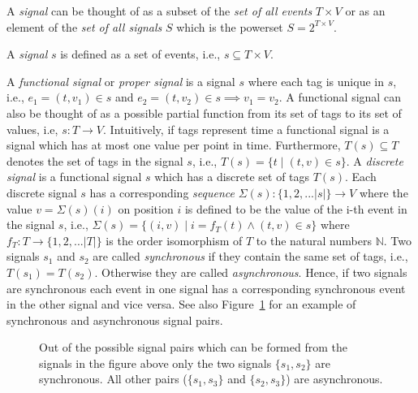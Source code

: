 A \emph{signal} can be thought of as a subset of the \emph{set of all events} $T \times V$ or as
an element of the \emph{set of all signals} $S$ which is the powerset $S = 2^{T \times V}$.
\begin{sdefinition}
A \emph{signal} $s$ is defined as a set of events, i.e., $s \subseteq T \times V$.
\end{sdefinition}
A \emph{functional signal} or \emph{proper signal} is a signal $s$ where each tag is unique in $s$,
i.e., $e_1 = (t,v_1) \in s$ and $e_2 = (t,v_2) \in s \implies v_1 = v_2$.
A functional signal can also be thought of as a possible partial function 
from its set of tags to its set of values, i.e, $s: T \to V$.
Intuitively, if tags represent time a functional signal is a signal which has
at most one value per point in time.
Furthermore, $T(s) \subseteq T$ denotes
the set of tags in the signal $s$, i.e., $T(s) = \{t \mid (t,v) \in s\}$.
A \emph{discrete signal} is a functional signal $s$ which has a discrete set of tags $T(s)$.
Each discrete signal $s$ has a corresponding \emph{sequence} $\Sigma(s) : \{1,2,...|s|\} \to V$
where the value $v = \Sigma(s)(i)$ on position $i$ is defined to be the value
of the i-th event in the signal $s$, i.e., $\Sigma(s) = \{ (i,v)  \mid i = f_T(t) \wedge (t,v) \in s\}$ where
$f_T : T \to \{1,2,...|T|\}$ is the order isomorphism of $T$ to the natural numbers $\mathbb{N}$.
Two signals $s_1$ and $s_2$ are called \emph{synchronous} if they contain
the same set of tags, i.e., $T(s_1) = T(s_2)$. Otherwise they are
called \emph{asynchronous}.
Hence, if two signals are synchronous each event in one
signal has a corresponding synchronous event in the other signal and vice versa.
See also Figure~\ref{fig:example-synchronous-signals} for an
example of synchronous and asynchronous signal pairs.

\begin{figure}
\centering

\caption{\label{fig:example-synchronous-signals}Out of the possible signal
  pairs which can be formed from the signals in the figure above only the
  two signals $\{s_1,s_2\}$ are synchronous.
  All other pairs ($\{s_1,s_3\}$ and $\{s_2,s_3\}$) are asynchronous.}
\end{figure}

